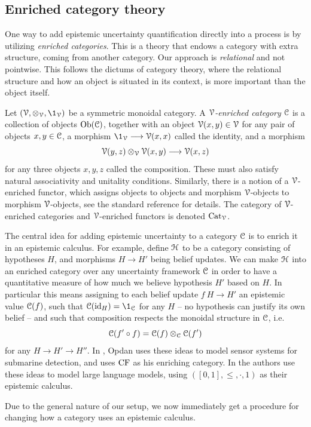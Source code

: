 \subsection{Enriched category theory}
One way to add epistemic uncertainty quantification directly into a process is by utilizing \emph{enriched categories}. This is a theory that endows a category with extra structure, coming from another category. Our approach is \emph{relational} and not pointwise. This follows the dictums of category theory, where the relational structure and how an object is situated in its context, is more important than the object itself. 

Let $(\V,\otimes_\V, \1_\V)$ be a symmetric monoidal category. A $\EuScript{V}$\emph{-enriched category} $\EuScript{C}$ is a collection of objects $\operatorname{Ob}(\EuScript{C})$, together with an object $\EuScript{V}(x,y) \in \EuScript{V}$ for any pair of objects $x, y \in \EuScript{C}$, a morphism $\1_\V \to \V(x,x)$ called the identity, and a morphism 
\[\EuScript{V}(y,z)\otimes_{\EuScript{V}} \EuScript{V}(x,y) \longrightarrow \EuScript{V}(x,z)\]
for any three objects $x, y, z$ called the composition. These must also satisfy natural associativity and unitality conditions. Similarly, there is a notion of a $\EuScript{V}$-enriched functor, which assigns objects to objects and morphism $\EuScript{V}$-objects to morphism $\EuScript{V}$-objects, see the standard reference \cite{kelly_1982} for details. The category of $\EuScript{V}$-enriched categories and $\EuScript{V}$-enriched functors is denoted $\mathrm{Cat}_{\EuScript{V}}$. 

The central idea for adding epistemic uncertainty to a category $\EuScript{C}$ is to enrich it in an epistemic calculus. For example, define $\EuScript{H}$ to be a category consisting of hypotheses $H$, and morphisms $H\to H'$ being belief updates. We can make $\EuScript{H}$ into an enriched category over any uncertainty framework $\EuScript{C}$ in order to have a quantitative measure of how much we believe hypothesis $H'$ based on $H$. In particular this means assigning to each belief update $f\: H\to H'$ an epistemic value $\EuScript{C}(f)$, such that $\C(\id_H) = \1_\C$ for any $H$ --  no hypothesis can justify its own belief -- and such that composition respects the monoidal structure in $\EuScript{C}$, i.e. 
\[\EuScript{C}(f'\circ f) = \EuScript{C}(f)\otimes_{\EuScript{C}} \EuScript{C}(f')\]
for any $H\to H'\to H''$. In \cite{opdan_2025}, Opdan uses these ideas to model sensor systems for submarine detection, and uses $\mathrm{CF}$ as his enriching category. In \cite{bradley-terilla-vlassopoulos_2022} the authors use these ideas to model large language models, using $([0,1], \leq, \cdot, 1)$ as their epistemic calculus. 

Due to the general nature of our setup, we now immediately get a procedure for changing how a category uses an epistemic calculus. 

